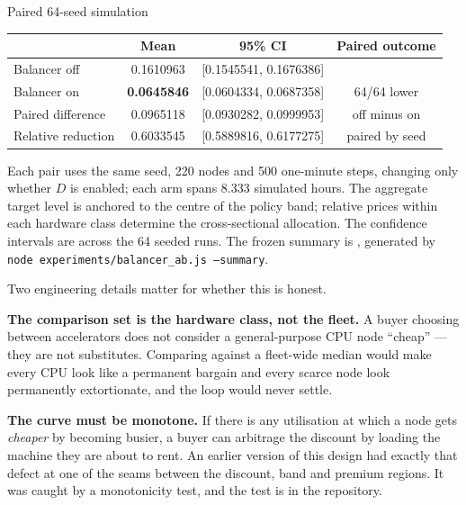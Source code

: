 \documentclass[11pt,letterpaper]{article}
\newcommand{\tagbox}[3]{\tikz[baseline=(X.base)]{\node[inner xsep=3.5pt,inner ysep=1.4pt,rounded corners=1.6pt,fill=#1,text=#2,font=\bfseries\sffamily\tiny] (X) {#3};}}
\newcommand{\MODELLED}{\tagbox{amberlite}{amber!55!black}{MODELLED}}
\begin{document}
\begin{resultbox}{Paired 64-seed simulation}
\begin{center}
\begin{tabular}{@{}lccc@{}}
\toprule
& \textbf{Mean} & \textbf{95\% CI} & \textbf{Paired outcome} \\
\midrule
Balancer off & 0.1610963 & [0.1545541, 0.1676386] & \\
Balancer on & \textbf{0.0645846} & [0.0604334, 0.0687358] & 64/64 lower \\
Paired difference & 0.0965118 & [0.0930282, 0.0999953] & off minus on \\
Relative reduction & 0.6033545 & [0.5889816, 0.6177275] & paired by seed \\
\bottomrule
\end{tabular}
\end{center}
\vspace{3pt}
Each pair uses the same seed, 220 nodes and 500 one-minute steps, changing only
whether $D$ is enabled; each arm spans 8.333 simulated hours. The aggregate
target level is anchored to the centre of the policy band; relative prices
within each hardware class determine the cross-sectional allocation. The
confidence intervals are across the 64 seeded runs. The frozen summary is
, generated by
\texttt{node experiments/balancer\_ab.js --summary}. \MODELLED
\end{resultbox}

Two engineering details matter for whether this is honest.

\textbf{The comparison set is the hardware class, not the fleet.} A buyer
choosing between accelerators does not consider a general-purpose CPU node
``cheap'' --- they are not substitutes. Comparing against a fleet-wide median
would make every CPU look like a permanent bargain and every scarce node look
permanently extortionate, and the loop would never settle.

\textbf{The curve must be monotone.} If there is any utilisation at which a
node gets \emph{cheaper} by becoming busier, a buyer can arbitrage the discount
by loading the machine they are about to rent. An earlier version of this
design had exactly that defect at one of the seams between the discount, band
and premium regions. It was caught by a monotonicity test, and the test is in
the repository.
\end{document}
